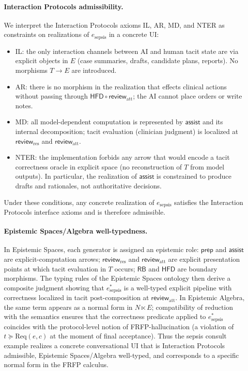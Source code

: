 \paragraph{Interaction Protocols admissibility.}
We interpret the Interaction Protocols axioms IL, AR, MD, and NTER as constraints on realizations of
$e_{\mathrm{sepsis}}$ in a concrete UI:
\begin{itemize}
  \item IL: the only interaction channels between AI and human tacit state are via explicit objects in
  $E$ (case summaries, drafts, candidate plans, reports). No morphisms $T \to E$ are introduced.
  \item AR: there is no morphism in the realization that effects clinical actions without passing
  through $\mathsf{HFD} \circ \mathsf{review}_\mathrm{att}$; the AI cannot place orders or write notes.
  \item MD: all model-dependent computation is represented by $\mathsf{assist}$ and its internal
  decomposition; tacit evaluation (clinician judgment) is localized at $\mathsf{review}_\mathrm{res}$ and
  $\mathsf{review}_\mathrm{att}$.
  \item NTER: the implementation forbids any arrow that would encode a tacit correctness oracle in
  explicit space (no reconstruction of $T$ from model outputs). In particular, the realization of
  $\mathsf{assist}$ is constrained to produce drafts and rationales, not authoritative decisions.
\end{itemize}
Under these conditions, any concrete realization of $e_{\mathrm{sepsis}}$ satisfies the Interaction Protocols
interface axioms and is therefore admissible.

\paragraph{Epistemic Spaces/Algebra well-typedness.}
In Epistemic Spaces, each generator is assigned an epistemic role: $\mathsf{prep}$ and $\mathsf{assist}$ are
explicit-computation arrows; $\mathsf{review}_\mathrm{res}$ and $\mathsf{review}_\mathrm{att}$ are explicit
presentation points at which tacit evaluation in $T$ occurs; $\mathsf{RB}$ and $\mathsf{HFD}$ are
boundary morphisms. The typing rules of the Epistemic Spaces ontology then derive a composite judgment
showing that $e_{\mathrm{sepsis}}^{\ast}$ is a well-typed explicit pipeline with correctness localized in
tacit post-composition at $\mathsf{review}_\mathrm{att}$. In Epistemic Algebra, the same term appears as a
normal form in $N \ltimes E$; compatibility of reduction with the semantics ensures that the
correctness predicate applied to $e_{\mathrm{sepsis}}^{\ast}$ coincides with the protocol-level notion of
FRFP-hallucination (a violation of $t \succeq \mathrm{Req}(e,c)$ at the moment of final acceptance).
Thus the sepsis consult example realizes a concrete conversational UI that is Interaction Protocols admissible,
Epistemic Spaces/Algebra well-typed, and corresponds to a specific normal form in the FRFP calculus.
